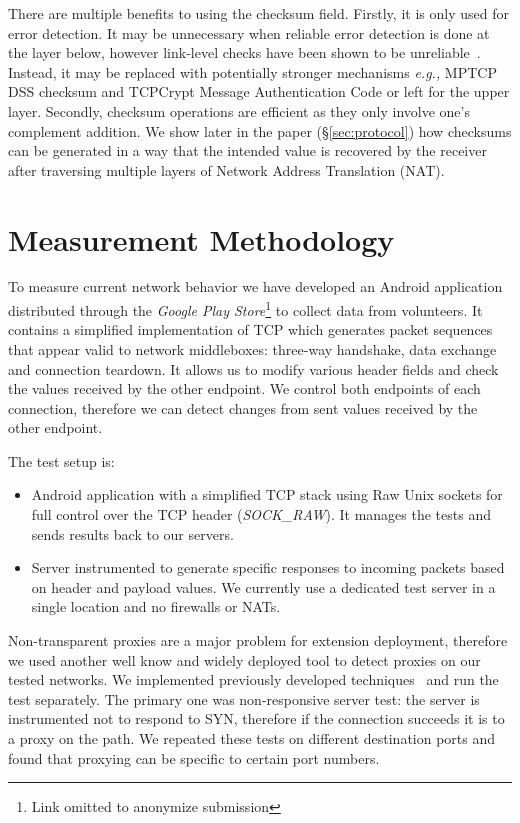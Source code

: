 \documentclass{sig-alternate-10pt}
\providecommand{\eg}{\emph{e.g.,} }
\begin{document}
There are multiple benefits to using the checksum field. Firstly, it is only used for error detection. It may be unnecessary when reliable error detection is done at the layer below, however link-level checks have been shown to be unreliable~\cite{Stone:2000fc}. Instead, it may be replaced with potentially stronger mechanisms \eg MPTCP DSS checksum and TCPCrypt Message Authentication Code or left for the upper layer. Secondly, checksum operations are efficient as they only involve one's complement addition. We show later in the paper (\S\ref{sec:protocol}) how checksums can be generated in a way that the intended value is recovered by the receiver after traversing multiple layers of Network Address Translation (NAT).

\section{Measurement Methodology}

To measure current network behavior we have developed an Android application distributed through the \emph{Google Play Store}\footnote{Link omitted to anonymize submission} to collect data from volunteers. It contains a simplified implementation of TCP which generates packet sequences that appear valid to network middleboxes: three-way handshake, data exchange and connection teardown. It allows us to modify various header fields and check the values received by the other endpoint. We control both endpoints of each connection, therefore we can detect changes from sent values received by the other endpoint.

The test setup is:
\begin{itemize}
    \item Android application with a simplified TCP stack using Raw Unix sockets for full control over the TCP header (\emph{SOCK\_RAW}). It manages the tests and sends results back to our servers. 
    \item Server instrumented to generate specific responses to incoming packets based on header and payload values. We currently use a dedicated test server in a single location and no firewalls or NATs.
\end{itemize}

Non-transparent proxies are a major problem for extension deployment, therefore we used another well know and widely deployed tool to detect proxies on our tested networks. We implemented previously developed techniques~\cite{Weaver:RHwbx82O} and run the test separately. The primary one was non-responsive server test: the server is instrumented not to respond to SYN, therefore if the connection succeeds it is to a proxy on the path. We repeated these tests on different destination ports and found that proxying can be specific to certain port numbers.
\end{document}
